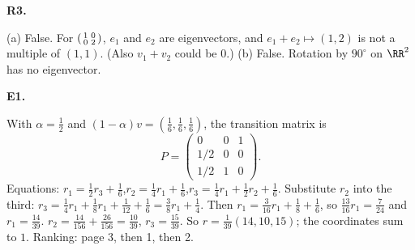 \documentclass[10pt]{scrartcl}
\begin{document}
\begin{prob}\textbf{R3.}\par{}
(a) False. For $\begin{psmallmatrix}1&0\\0&2\end{psmallmatrix}$, $e_1$ and $e_2$ are eigenvectors, and $e_1+e_2\mapsto(1,2)$ is not a multiple of $(1,1)$. (Also $v_1+v_2$ could be $0$.) (b) False. Rotation by $90^\circ$ on $\RR^2$ has no eigenvector.
\end{prob}

\begin{prob}\textbf{E1.}\par{}
\begin{steps}
  \ii With $\alpha=\frac12$ and $(1-\alpha)v=(\frac16,\frac16,\frac16)$, the transition matrix is
  \[
    P=\begin{pmatrix}0&0&1\\1/2&0&0\\1/2&1&0\end{pmatrix}.
  \]
  \ii Equations: $r_1=\frac12r_3+\frac16$,\quad $r_2=\frac14r_1+\frac16$,\quad $r_3=\frac14r_1+\frac12r_2+\frac16$.
  \ii Substitute $r_2$ into the third: $r_3=\frac14r_1+\frac18r_1+\frac1{12}+\frac16=\frac38r_1+\frac14$. Then $r_1=\frac3{16}r_1+\frac18+\frac16$, so $\frac{13}{16}r_1=\frac7{24}$ and $r_1=\frac{14}{39}$.
  \ii $r_2=\frac{14}{156}+\frac{26}{156}=\frac{10}{39}$, $r_3=\frac{15}{39}$. So $r=\frac1{39}(14,10,15)$; the coordinates sum to $1$. Ranking: page 3, then 1, then 2.
\end{steps}
\end{prob}
\end{document}
